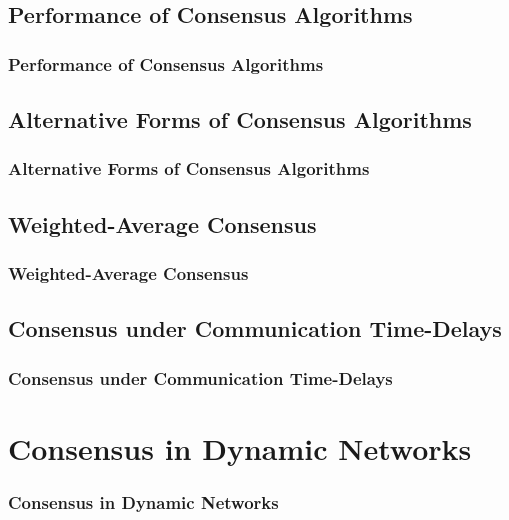 \documentclass{beamer}
\begin{document}
\subsection{Performance of Consensus Algorithms}

\begin{frame}
\frametitle{Performance of Consensus Algorithms}

\end{frame}

\subsection{Alternative Forms of Consensus Algorithms}

\begin{frame}
\frametitle{Alternative Forms of Consensus Algorithms}

\end{frame}

\subsection{Weighted-Average Consensus}

\begin{frame}
\frametitle{Weighted-Average Consensus}

\end{frame}

\subsection{Consensus under Communication Time-Delays}

\begin{frame}
\frametitle{Consensus under Communication Time-Delays}

\end{frame}


\section{Consensus in Dynamic Networks}

\begin{frame}
\frametitle{Consensus in Dynamic Networks}


\end{frame}
\end{document}
